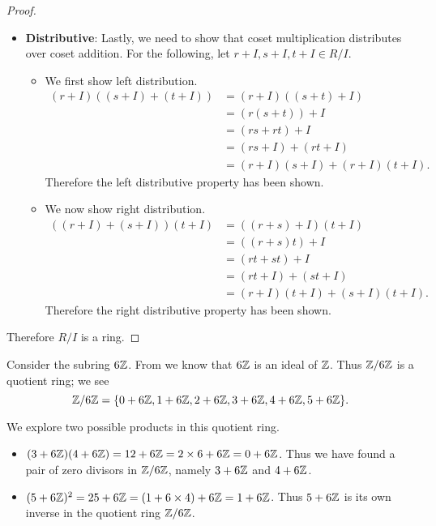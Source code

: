 \begin{proof}
\begin{itemize}
\begin{itemize}
        \end{itemize}
        \item \textbf{Distributive}: Lastly, we need to show that coset multiplication distributes over coset addition. For the following, let $r+I, s+I, t+I \in R/I$.
        \begin{itemize}
            \item We first show left distribution.
            \begin{align*}
                (r+I)((s+I)+(t+I)) &= (r+I)((s+t)+I)\\
                &= (r(s+t))+I\\
                &= (rs+rt)+I\\
                &= (rs+I) + (rt+I)\\
                &=(r+I)(s+I) + (r+I)(t+I).
            \end{align*}
            Therefore the left distributive property has been shown.

            \item We now show right distribution.
            \begin{align*}
                ((r+I)+(s+I))(t+I) &= ((r+s)+I)(t+I)\\
                &= ((r+s)t)+I\\
                &= (rt+st)+I\\
                &= (rt+I) + (st+I)\\
                &= (r+I)(t+I) + (s+I)(t+I).
            \end{align*}
            Therefore the right distributive property has been shown.
        \end{itemize}
    \end{itemize}
    Therefore $R/I$ is a ring.
\end{proof}

\begin{example}
    Consider the subring $6\mathbb{Z}$. From  we know that $6\mathbb{Z}$ is an ideal of $\mathbb{Z}$. Thus $\mathbb{Z}/6\mathbb{Z}$ is a quotient ring; we see
    \[
        \mathbb{Z}/6\mathbb{Z} = \{0 + 6\mathbb{Z}, 1+6\mathbb{Z}, 2+6\mathbb{Z}, 3+6\mathbb{Z}, 4+6\mathbb{Z}, 5+6\mathbb{Z}\}.
    \]

    We explore two possible products in this quotient ring.
    \begin{itemize}
        \item $(3+6\mathbb{Z})(4+6\mathbb{Z}) = 12+6\mathbb{Z} = 2\times 6 + 6\mathbb{Z} = 0 + 6\mathbb{Z}$. Thus we have found a pair of zero divisors in $\mathbb{Z}/6\mathbb{Z}$, namely $3+6\mathbb{Z}$ and $4+6\mathbb{Z}$.
        \item $(5+6\mathbb{Z})^2 = 25+6\mathbb{Z} = (1 + 6\times4) + 6\mathbb{Z} = 1 + 6\mathbb{Z}$. Thus $5+6\mathbb{Z}$ is its own inverse in the quotient ring $\mathbb{Z}/6\mathbb{Z}$.
    \end{itemize}
\end{example}

